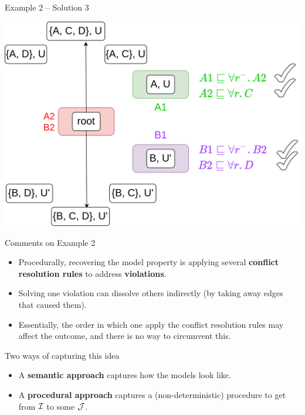 \documentclass[10pt]{beamer}
\begin{document}
\begin{frame}[fragile]{Example 2 -- Solution 3}
  \begin{center}
  \includegraphics[scale=.25]{img/ex2_5.png}
  \end{center}
\end{frame}

\begin{frame}[fragile]{Comments on Example 2}

  \begin{itemize}
    \item Procedurally, recovering the model property is applying several \textbf{conflict resolution rules} to address \textbf{violations}.
    \item Solving one violation can dissolve others indirectly (by taking away edges that caused them).
    \item Essentially, the order in which one apply the conflict resolution rules may affect the outcome, and there is no way to circumvent this.
  \end{itemize}

\end{frame}

\begin{frame}[fragile]{Two ways of capturing this idea}
  \begin{itemize}
    \item A \textbf{semantic approach} captures how the models look like.
    \item A \textbf{procedural approach} captures a (non-deterministic) procedure to get from $\mathcal{I}$ to some $\mathcal{J}$.
  \end{itemize}
\end{frame}
\end{document}
